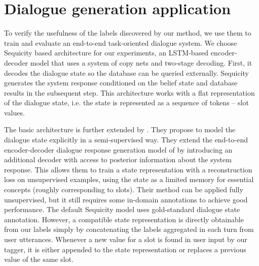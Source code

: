 
\section{Dialogue generation application}
To verify the usefulness of the labels discovered by our method, we use them to train and evaluate an end-to-end task-oriented dialogue system.
We choose Sequicity \cite{lei2018sequicity} based architecture for our experiments, an LSTM-based encoder-decoder model that uses a system of copy nets and two-stage decoding.
First, it decodes the dialogue state so the database can be queried externally.
Sequicity generates the system response conditioned on the belief state and database results in the subsequent step.
This architecture works with a flat representation of the dialogue state, i.e. the state is represented as a sequence of tokens -- slot values.

The basic architecture is further extended by \citet{jin2018explicit}.
They propose to model the dialogue state explicitly in a semi-supervised way.
They extend the end-to-end encoder-decoder dialogue response generation model of \citet{lei2018sequicity} by introducing an additional decoder with access to posterior information about the system response.
This allows them to train a state representation with a reconstruction loss on unsupervised examples, using the state as a limited memory for essential concepts (roughly corresponding to slots).
Their method can be applied fully unsupervised, but it still requires some in-domain annotations to achieve good performance.
The default Sequicity model uses gold-standard dialogue state annotation. However, a compatible state representation is directly obtainable from our labels simply by concatenating the labels aggregated in each turn from user utterances. Whenever a new value for a slot is found in user input by our tagger, it is either appended to the state representation or replaces a previous value of the same slot.

